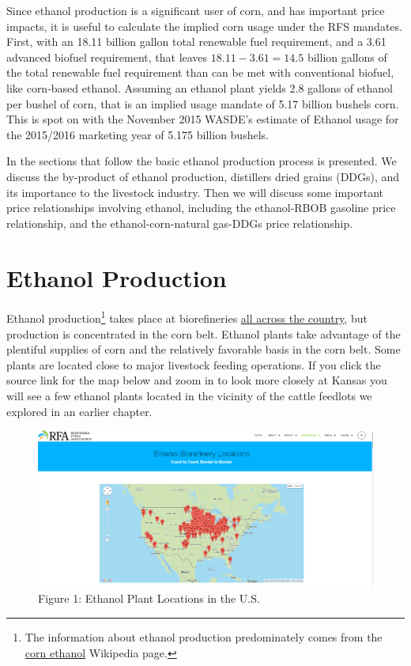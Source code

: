 \documentclass[]{book}
\let\rmarkdownfootnote\footnote%
\def\footnote{\protect\rmarkdownfootnote}
\theoremstyle{definition}
\theoremstyle{definition}
\theoremstyle{remark}
\begin{document}
Since ethanol production is a significant user of corn, and has
important price impacts, it is useful to calculate the implied corn
usage under the RFS mandates. First, with an 18.11 billion gallon total
renewable fuel requirement, and a 3.61 advanced biofuel requirement,
that leaves \(18.11 - 3.61 = 14.5\) billion gallons of the total
renewable fuel requirement than can be met with conventional biofuel,
like corn-based ethanol. Assuming an ethanol plant yields 2.8 gallons of
ethanol per bushel of corn, that is an implied usage mandate of 5.17
billion bushels corn. This is spot on with the November 2015 WASDE's
estimate of Ethanol usage for the 2015/2016 marketing year of 5.175
billion bushels.

In the sections that follow the basic ethanol production process is
presented. We discuss the by-product of ethanol production, distillers
dried grains (DDGs), and its importance to the livestock industry. Then
we will discuss some important price relationships involving ethanol,
including the ethanol-RBOB gasoline price relationship, and the
ethanol-corn-natural gas-DDGs price relationship.

\section{Ethanol Production}\label{ethanol-production}

Ethanol production\footnote{The information about ethanol production
  predominately comes from the
  \href{https://en.wikipedia.org/wiki/Corn_ethanol}{corn ethanol}
  Wikipedia page.} takes place at biorefineries
\href{http://www.ethanolrfa.org/resources/biorefinery-locations/}{all
across the country}, but production is concentrated in the corn belt.
Ethanol plants take advantage of the plentiful supplies of corn and the
relatively favorable basis in the corn belt. Some plants are located
close to major livestock feeding operations. If you click the source
link for the map below and zoom in to look more closely at Kansas you
will see a few ethanol plants located in the vicinity of the cattle
feedlots we explored in an earlier chapter.

\begin{figure}[htbp]
\centering
\includegraphics{images/eth_locations.png}
\caption{Figure 1: Ethanol Plant Locations in the U.S.}
\end{figure}
\end{document}
